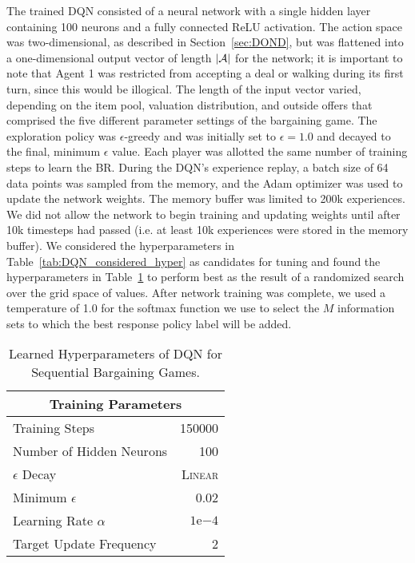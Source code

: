 The trained DQN consisted of a neural network with a single hidden layer containing 100 neurons and a fully connected ReLU activation. The action space was two-dimensional, as described in Section~\ref{sec:DOND}, but was flattened into a one-dimensional output vector of length $\vert \mathcal{A} \vert$ for the network; it is important to note that Agent 1 was restricted from accepting a deal or walking during its first turn, since this would be illogical. The length of the input vector varied, depending on the item pool, valuation distribution, and outside offers that comprised the five different parameter settings of the bargaining game. The exploration policy was $\epsilon$-greedy and was initially set to $\epsilon = 1.0$ and decayed to the final, minimum $\epsilon$ value.
Each player was allotted the same number of training steps to learn the BR. During the DQN's experience replay, a batch size of 64 data points was sampled from the memory, and the Adam optimizer was used to update the network weights. The memory buffer was limited to 200k experiences. We did not allow the network to begin training and updating weights until after 10k timesteps had passed (i.e. at least 10k experiences were stored in the memory buffer). We considered the hyperparameters in Table~\ref{tab:DQN_considered_hyper} as candidates for tuning and found the hyperparameters in Table~\ref{tab:DQN_params} to perform best as the result of a randomized search over the grid space of values. After network training was complete, we used a temperature of 1.0 for the softmax function we use to select the $M$ information sets to which the best response policy label will be added.

\begin{table}[h!]
    \centering
    \begin{tabular}{|l||r|}
    \hline
    \multicolumn{2}{|c|}{Training Parameters} \\
    \hline
        Training Steps & 150000 \\
        Number of Hidden Neurons & 100 \\
        $\epsilon$ Decay & \textsc{Linear} \\
        Minimum $\epsilon$ & 0.02 \\
        Learning Rate $\alpha$ & $1\mathrm{e}{-4}$ \\
        Target Update Frequency & 2 \\
    \hline
    \end{tabular}
    \vspace{1em}
    \caption{Learned Hyperparameters of DQN for Sequential Bargaining Games.}
    \label{tab:DQN_params}
\end{table}

